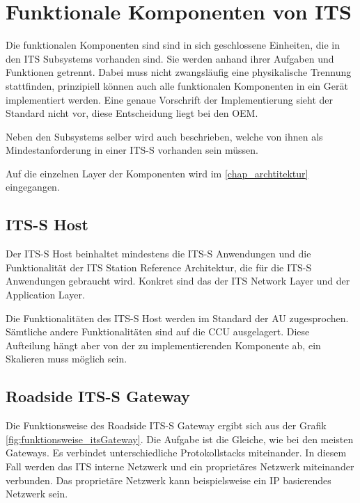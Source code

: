 \section{Funktionale Komponenten von ITS \label{funktionsweise_funktionaleKomponenten}}
Die funktionalen Komponenten sind sind in sich geschlossene Einheiten, die in den \ac{ITS} Subsystems vorhanden sind. Sie werden anhand ihrer Aufgaben und Funktionen getrennt. Dabei muss nicht zwangsläufig eine physikalische Trennung stattfinden, prinzipiell können auch alle funktionalen Komponenten in ein Gerät implementiert werden. Eine genaue Vorschrift der Implementierung sieht der Standard nicht vor, diese Entscheidung liegt bei den \ac{OEM}. 

Neben den Subsystems selber wird auch beschrieben, welche von ihnen als Mindestanforderung in einer \ac{ITS-S} vorhanden sein müssen.

Auf die einzelnen Layer der Komponenten wird im \autoref{chap_archtitektur} eingegangen.   

\subsection{ITS-S Host \label{funktionsweise_ITSHost}}
Der \ac{ITS-S} Host beinhaltet mindestens die \ac{ITS-S} Anwendungen und die Funktionalität der ITS  Station Reference Architektur, die für die  \ac{ITS-S} Anwendungen gebraucht wird. Konkret sind das der \ac{ITS} Network Layer und der Application Layer. 

Die Funktionalitäten des \ac{ITS-S} Host werden im Standard \cite{etsi302636-3} der \ac{AU} zugesprochen. Sämtliche andere Funktionalitäten sind auf die \ac{CCU} ausgelagert. Diese Aufteilung hängt aber von der zu implementierenden Komponente ab, ein Skalieren muss möglich sein.

\subsection{Roadside ITS-S Gateway \label{funktionsweise_RoadsideITSGateway}}
Die Funktionsweise des Roadside \ac{ITS-S} Gateway ergibt sich aus der Grafik \ref{fig:funktionsweise_itsGateway}. Die Aufgabe ist die Gleiche, wie bei den meisten Gateways. Es verbindet unterschiedliche Protokollstacks miteinander. In diesem Fall werden das \ac{ITS} interne Netzwerk und ein proprietäres Netzwerk miteinander verbunden. Das proprietäre Netzwerk kann beispielsweise ein IP basierendes Netzwerk sein.


